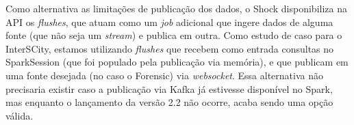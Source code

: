 

Como alternativa as limitações de publicação dos dados, o Shock disponibiliza
na API os \textit{flushes}, que atuam como um \textit{job} adicional que ingere
dados de alguma fonte (que não seja um \textit{stream}) e publica em outra.
Como estudo de caso para o InterSCity, estamos utilizando \textit{flushes} que
recebem como entrada consultas no SparkSession (que foi populado pela
publicação via memória), e que publicam em uma fonte desejada (no caso o
Forensic) via \textit{websocket}. Essa alternativa não precisaria existir caso
a publicação via Kafka já estivesse disponível no Spark, mas enquanto o
lançamento da versão 2.2 não ocorre, acaba sendo uma opção válida.
